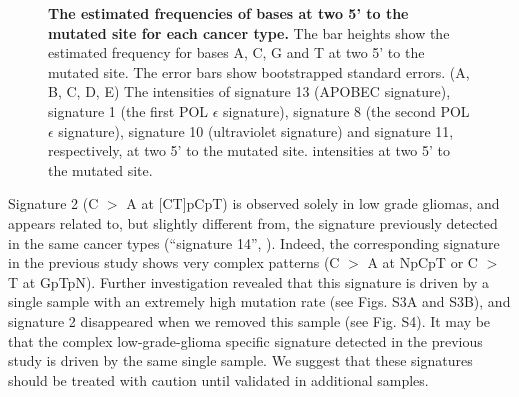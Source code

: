 \documentclass[10pt,letterpaper]{article}
\begin{document}
\begin{figure}[h]
\caption{{\bf The estimated frequencies of bases at two 5' to the mutated site for each cancer type.}
The bar heights show the estimated frequency for bases A, C, G and T at two 5' to the mutated site.
The error bars show bootstrapped standard errors.
(A, B, C, D, E) The intensities of signature 13 (APOBEC signature), signature 1 (the first POL $\epsilon$ signature),
signature 8 (the second POL $\epsilon$ signature), signature 10 (ultraviolet signature) and signature 11, respectively, at two 5' to the mutated site.
intensities at two 5' to the mutated site.
}
\label{two5prime}
\end{figure}


Signature 2 (C $>$ A at [CT]pCpT) is observed solely in low grade gliomas, and
appears related to, but slightly different from, the signature previously detected in the same cancer types (``signature 14'', \cite{pmid23318258}). 
Indeed, the corresponding signature in the previous study shows very complex patterns (C $>$ A at NpCpT or C $>$ T at GpTpN). Further investigation
revealed that this signature is driven by 
a single sample with an extremely high mutation rate (see Figs. S3A and S3B), and signature 2 disappeared when we removed this sample (see Fig. S4).
It may be that the complex low-grade-glioma specific signature detected in the previous study is driven by the same single sample.
We suggest that these signatures should be treated with caution until validated in additional samples. 
 
\end{document}

